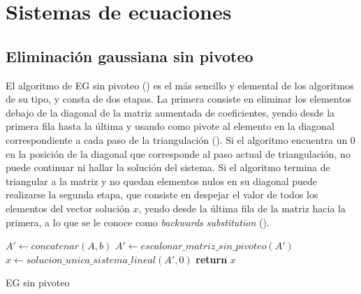 \section{Sistemas de ecuaciones}
\label{sistemas_de_ecuaciones}

\subsection{Eliminación gaussiana sin pivoteo}
\label{sistemas_de_ecuaciones_EG_sin}

El algoritmo de EG sin pivoteo () es el más sencillo y elemental de los algoritmos de su tipo, y consta de dos etapas. La primera consiste en eliminar los elementos debajo de la diagonal de la matriz aumentada de coeficientes, yendo desde la primera fila hasta la última y usando como pivote al elemento en la diagonal correspondiente a cada paso de la triangulación (). Si el algoritmo encuentra un 0 en la posición de la diagonal que corresponde al paso actual de triangulación, no puede continuar ni hallar la solución del sistema. Si el algoritmo termina de triangular a la matriz y no quedan elementos nulos en su diagonal puede realizarse la segunda etapa, que consiste en despejar el valor de todos los elementos del vector solución $x$, yendo desde la última fila de la matriz hacia la primera, a lo que se le conoce como \textit{backwards substitution} ().

\begin{algorithm}[H]
\begin{algorithmic}[1]
    \State $A' \gets concatenar(A, b)$ 
    \State $A' \gets escalonar\_matriz\_sin\_pivoteo(A')$ 
    \State $x \gets solucion\_unica\_sistema\_lineal(A', 0)$ 
    \State \textbf{return} $x$
\EndFunction
\end{algorithmic}
\caption{EG sin pivoteo}
\label{alg:eg_sin_pivoteo}
\end{algorithm}

